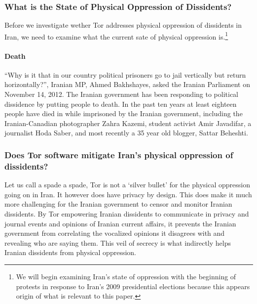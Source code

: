 \documentclass[11pt]{article}
\begin{document}
\begin{multicols}{2}
\subsubsection{What is the State of Physical Oppression of Dissidents?}
Before we investigate wether Tor addresses physical oppression of dissidents in
Iran, we need to examine what the current sate of physical oppression
is.\footnote{We will begin examining Iran's state of oppression with the beginning
of protests in response to Iran's 2009 presidential elections because this
appears origin of what is relevant to this paper.}

\paragraph{Death}

``Why is it that in our country political prisoners go to jail vertically but return
horizontally?'', Iranian MP, Ahmed Bakhshayes, asked the Iranian Parliament on
November 14, 2012.\cite{IranBloggersDeath} The Iranian government has been
responding to political dissidence by putting people to death. In the past ten
years at least eighteen people have died in while imprisoned by the Iranian
government, including the Iranian-Canadian photographer Zahra Kazemi, student
activist Amir Javadifar, a journalist Hoda Saber, and most recently a 35 year
old blogger, Sattar Beheshti. \cite{IranBloggersDeath}


\subsubsection{Does Tor software mitigate Iran's physical oppression of
dissidents?}

Let us call a spade a spade, Tor is not a `silver bullet' for the physical
oppression going on in Iran. It however does have privacy by design. This does
make it much more challenging for the Iranian government to censor and monitor
Iranian dissidents. By Tor empowering Iranian dissidents to communicate in
privacy and journal events and opinions of Iranian current affairs, it prevents
the Iranian government from correlating the vocalized opinions it disagrees with
and revealing who are saying them. This veil of secrecy is what indirectly helps
Iranian dissidents from physical oppression.



\end{multicols}
\end{document}
